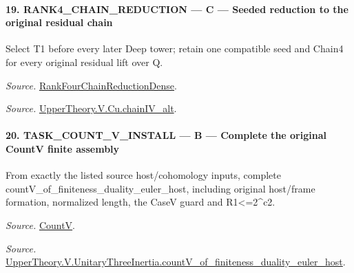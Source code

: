 \documentclass[11pt,a4paper]{article}
\numberwithin{equation}{section}
\theoremstyle{remark}\newtheorem{remark}[theorem]{Remark}
\begin{document}
\paragraph{19. RANK4\_\allowbreak CHAIN\_\allowbreak REDUCTION — C — Seeded reduction to the original residual chain}

Select T1 before every later Deep tower; retain one compatible seed and Chain4 for every original residual lift over Q.

\emph{Source.} \href{https://github.com/CocoSgt/riemann-hypothesis-lean/blob/7cbf7a0c32fca1badf05931879a37c3f8a2b03b4/src/Development/AutomorphicArithmetic/AutomorphicVarieties/ModularityArgument/ThresholdArguments/DenseThresholdCases/PromodularityCaseThree.lean#L33-L39}{RankFourChainReductionDense}.

\emph{Source.} \href{https://github.com/CocoSgt/riemann-hypothesis-lean/blob/7cbf7a0c32fca1badf05931879a37c3f8a2b03b4/src/Development/AutomorphicArithmetic/AutomorphicVarieties/ModularityArgument/ThresholdArguments/DenseThresholdCases/CuPChainIV.lean#L16-L82}{UpperTheory.V.Cu.chainIV\_\allowbreak alt}.



\paragraph{20. TASK\_\allowbreak COUNT\_\allowbreak V\_\allowbreak INSTALL — B — Complete the original CountV finite assembly}

From exactly the listed source host/cohomology inputs, complete countV\_\allowbreak of\_\allowbreak finiteness\_\allowbreak duality\_\allowbreak euler\_\allowbreak host, including original host/frame formation, normalized length, the CaseV guard and R1<=2\textasciicircum{}c2.

\emph{Source.} \href{https://github.com/CocoSgt/riemann-hypothesis-lean/blob/7cbf7a0c32fca1badf05931879a37c3f8a2b03b4/src/Development/AutomorphicArithmetic/AutomorphicVarieties/HeightAndVanishing/Counts.lean#L69-L69}{CountV}.

\emph{Source.} \href{https://github.com/CocoSgt/riemann-hypothesis-lean/blob/7cbf7a0c32fca1badf05931879a37c3f8a2b03b4/src/Development/AutomorphicArithmetic/AutomorphicVarieties/ModularityArgument/ThresholdArguments/DenseThresholdCases/CountVOf.lean#L33-L60}{UpperTheory.V.UnitaryThreeInertia.countV\_\allowbreak of\_\allowbreak finiteness\_\allowbreak duality\_\allowbreak euler\_\allowbreak host}.
\end{document}
